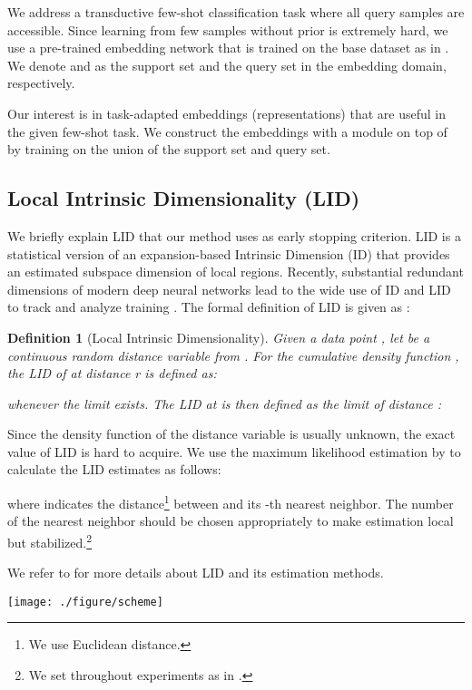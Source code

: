 \documentclass{article}
\newtheorem{definition}{Definition}
\begin{document}
We address a transductive few-shot classification task where all query samples are accessible.
Since learning from few samples without prior is extremely hard, we use a pre-trained embedding network  that is trained on the base dataset as in \citet{LEO, SimpleShot, SIB, LaplacianShot}.
We denote  and  as the support set and the query set in the embedding domain, respectively.

Our interest is in task-adapted embeddings (representations) that are useful in the given few-shot task.
We construct the embeddings with a module  on top of  by training on the union of the support set and query set.




\subsection{Local Intrinsic Dimensionality (LID)}
\label{subsection:LID}
We briefly explain LID that our method uses as early stopping criterion.
LID is a statistical version of an expansion-based Intrinsic Dimension (ID) that provides an estimated subspace dimension of local regions.
Recently, substantial redundant dimensions of modern deep neural networks lead to the wide use of ID and LID to track and analyze training \cite{Amsaleg17, Ma18a, Ma18b, Ansuini19, Gong19}.
The formal definition of LID is given as \cite{Amsaleg15, Houle17a, Houle17b}:
\begin{definition}[Local Intrinsic Dimensionality]
	Given a data point , let  be a continuous random distance variable from . For the cumulative density function , the {\normalfont LID} of  at distance r is defined as{\normalfont:}
	
	whenever the limit exists. The {\normalfont LID} at  is then defined as the limit of distance {\normalfont:}
	 
\end{definition}

Since the density function of the distance variable is usually unknown, the exact value of LID is hard to acquire.
We use the maximum likelihood estimation by \citet{Amsaleg15} to calculate the LID estimates as follows:
 
where  indicates the distance\footnote{We use Euclidean distance.} between  and its -th nearest neighbor.
The number of the nearest neighbor  should be chosen appropriately to make estimation local but stabilized.\footnote{We set  throughout experiments as in \citet{Ma18a}.}

We refer to \citet{Amsaleg15, Houle17a, Houle17b} for more details about LID and its estimation methods.   \begin{figure*}[ht]
	\vskip -0.1in
	\begin{center}
		\centerline{\texttt{[image: ./figure/scheme]}}
		\vskip -0.15in
		\caption{
			Overview of our method.
			1-(a) shows the case without embedding adaptation, and 1-(b) shows the case with embedding adaptation.
			Our scheme mainly consists of \textit{feature reconstruction training} and \textit{dimensionality-driven early stopping}, and provides new embeddings of generalizable features for the downstream few-shot task.
	}
		\label{Overview}
	\end{center}
	\vskip -0.3in
\end{figure*}
\end{document}
